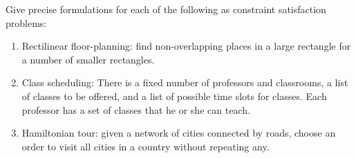 \begin{exercise}%
Give precise formulations for each of the following as constraint satisfaction problems:
\begin{enumerate}



\item Rectilinear floor-planning:
find non-overlapping places in a large rectangle for a number of
smaller rectangles.
\item Class scheduling:  There is a fixed number of professors 
and classrooms, a list of classes to be offered, and a list of possible time slots
for classes.  Each professor has a set of classes that he or she can teach.

\item Hamiltonian tour: given a network of cities connected by roads, choose an order to visit all cities in a 
country without repeating any.   
\end{enumerate}
\end{exercise} 

